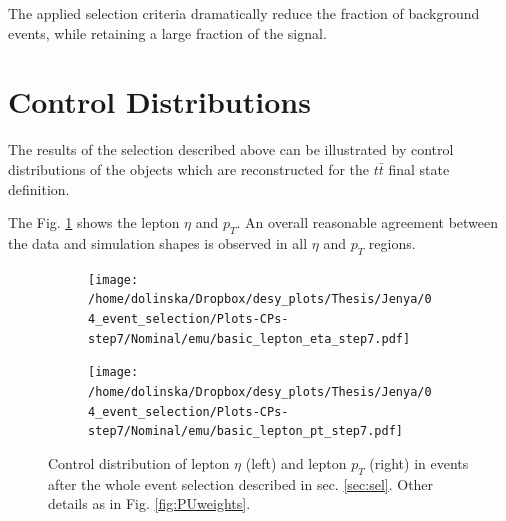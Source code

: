 The applied selection criteria dramatically reduce the fraction of background events, while retaining a large fraction of the signal.

\section{Control Distributions}

The results of the selection described above can be illustrated by control distributions of the objects which are reconstructed for the $t\bar{t}$
final state definition.

The Fig. \ref{fig:CPetaptLep} shows the lepton $\eta$ and $p_{T}$. An overall reasonable agreement between the data and simulation shapes is observed in all $\eta$ and $p_{T}$
regions. 

 \begin{figure}[h]
 \centering
 \begin{subfigure}
   \centering
   \texttt{[image: /home/dolinska/Dropbox/desy\_plots/Thesis/Jenya/04\_event\_selection/Plots-CPs-step7/Nominal/emu/basic\_lepton\_eta\_step7.pdf]}
 \end{subfigure}
 \begin{subfigure}
   \centering
   \texttt{[image: /home/dolinska/Dropbox/desy\_plots/Thesis/Jenya/04\_event\_selection/Plots-CPs-step7/Nominal/emu/basic\_lepton\_pt\_step7.pdf]}
 \end{subfigure}
 \caption{Control distribution of lepton $\eta$ (left) and lepton $p_{T}$ (right) in events after the whole event selection described in sec. \ref{sec:sel}. 
 Other details as in Fig. \ref{fig:PUweights}.}
 \label{fig:CPetaptLep}
 \end{figure}
%  
 
